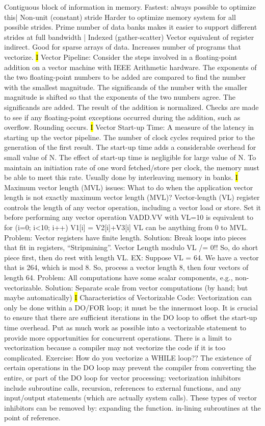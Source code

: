\documentclass[fontsize=4pt]{scrartcl}
\begin{document}
Contiguous block of information in memory. Fastest: always possible to optimize this| Non-unit (constant) stride Harder to optimize memory system for all possible strides. Prime number of data banks makes it easier to support different strides at full bandwidth | Indexed (gather-scatter) Vector equivalent of register indirect. Good for sparse arrays of data. Increases number of programs that vectorize.
\hl{I}
Vector Pipeline: Consider the steps involved in a floating-point addition on a vector machine with IEEE Arithmetic hardware. The exponents of the two floating-point numbers to be added are compared to find the number with the smallest magnitude. The significands of the number with the smaller magnitude is shifted so that the exponents of the two numbers agree. The significands are added. The result of the addition is normalized. Checks are made to see if any floating-point exceptions occurred during the addition, such as overflow. Rounding occurs.
\hl{I}
Vector Start-up Time:  A measure of the latency in starting up the vector pipeline. The number of clock cycles required prior to the generation of the first result. The start-up time adds a considerable overhead for small value of N. The effect of start-up time  is negligible for large value of N. To maintain an initiation rate of one word fetched/store per clock, the memory must be able to meet this rate. Usually done by interleaving memory in banks.
\hl{I}
Maximum vector length  (MVL) issues: What to do when the application vector length is not exactly maximum vector length  (MVL)?
Vector-length (VL) register controls the length of any vector operation, including a vector load or store. Set it before performing any vector operation VADD.VV with VL=10 is equivalent to for (i=0; i<10; i++) V1[i] = V2[i]+V3[i] VL can be anything from 0 to MVL. Problem: Vector registers have finite length. Solution: Break loops into pieces that fit in registers, “Stripmining”. Vector Length modulo VL /= 0!! So, do short piece first, then do rest with length VL. EX: Suppose VL = 64. We have a vector that is 264, which is mod 8. So, process a vector length 8, then four vectors of length 64. Problem: All computations have some scalar components, e.g., non-vectorizable. Solution: Separate scale from vector computations (by hand; but maybe automatically)
\hl{I}
Characteristics of Vectorizable Code: Vectorization can only be done within a DO/FOR loop; it must be the innermost loop. It is crucial to ensure that there are sufficient iterations in the DO loop to offset the start-up time overhead. Put as much work as possible into a vectorizable statement to provide more opportunities for concurrent operations. There is a limit to vectorization because a compiler may not vectorize the code if it is too complicated. Exercise: How do you vectorize a WHILE loop?? The existence of certain operations in the DO loop may prevent the compiler from converting the entire, or part of the DO loop for vector processing: vectorization inhibitors include subroutine calls, recursion, references to external functions, and any input/output statements (which are actually system calls). These types of vector inhibitors can be removed by: expanding the function. in-lining subroutines at the point of reference.
\end{document}
